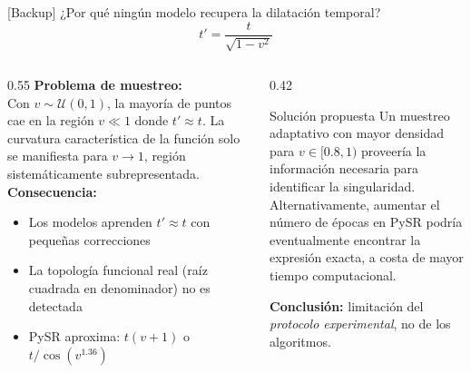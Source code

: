 \documentclass[10pt, aspectratio=169]{beamer}
\begin{document}
\begin{frame}{[Backup] ¿Por qué ningún modelo recupera la dilatación temporal?}
  \[
    t' = \frac{t}{\sqrt{1 - v^2}}
  \]
  \begin{columns}[T]
    \begin{column}{0.55\textwidth}
      \textbf{Problema de muestreo:}\\
      Con $v \sim \mathcal{U}(0, 1)$, la mayoría de puntos
      cae en la región $v \ll 1$ donde $t' \approx t$.
      La curvatura característica de la función solo se
      manifiesta para $v \to 1$, región sistemáticamente subrepresentada.\\[0.5em]
      \textbf{Consecuencia:}
      \begin{itemize}
        \item Los modelos aprenden $t' \approx t$ con pequeñas correcciones
        \item La topología funcional real (raíz cuadrada en denominador)
              no es detectada
        \item PySR aproxima: $t(v+1)$ o $t/\cos(v^{1.36})$
      \end{itemize}
    \end{column}
    \begin{column}{0.42\textwidth}
      \begin{block}{Solución propuesta}
        Un muestreo adaptativo con mayor densidad para $v \in [0.8, 1)$
        proveería la información necesaria para identificar la singularidad.
        \\[0.4em]
        Alternativamente, aumentar el número de épocas
        en PySR podría eventualmente encontrar la expresión exacta,
        a costa de mayor tiempo computacional.
      \end{block}
      \vspace{0.4em}
      \small
      \textbf{Conclusión:} limitación del \textit{protocolo experimental},
      no de los algoritmos.
    \end{column}
  \end{columns}
\end{frame}
\end{document}
